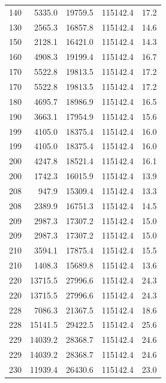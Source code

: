 \begin{longtable}{rrrrr}
    140 & \num{5335.0} & \num{19759.5} & \num{115142.4} & 17.2 \\
    130 & \num{2565.3} & \num{16857.8} & \num{115142.4} & 14.6 \\
    150 & \num{2128.1} & \num{16421.0} & \num{115142.4} & 14.3 \\
    160 & \num{4908.3} & \num{19199.4} & \num{115142.4} & 16.7 \\
    170 & \num{5522.8} & \num{19813.5} & \num{115142.4} & 17.2 \\
    170 & \num{5522.8} & \num{19813.5} & \num{115142.4} & 17.2 \\
    180 & \num{4695.7} & \num{18986.9} & \num{115142.4} & 16.5 \\
    190 & \num{3663.1} & \num{17954.9} & \num{115142.4} & 15.6 \\
    199 & \num{4105.0} & \num{18375.4} & \num{115142.4} & 16.0 \\
    199 & \num{4105.0} & \num{18375.4} & \num{115142.4} & 16.0 \\
    200 & \num{4247.8} & \num{18521.4} & \num{115142.4} & 16.1 \\
    200 & \num{1742.3} & \num{16015.9} & \num{115142.4} & 13.9 \\
    208 & \num{947.9} & \num{15309.4} & \num{115142.4} & 13.3 \\
    208 & \num{2389.9} & \num{16751.3} & \num{115142.4} & 14.5 \\
    209 & \num{2987.3} & \num{17307.2} & \num{115142.4} & 15.0 \\
    209 & \num{2987.3} & \num{17307.2} & \num{115142.4} & 15.0 \\
    210 & \num{3594.1} & \num{17875.4} & \num{115142.4} & 15.5 \\
    210 & \num{1408.3} & \num{15689.8} & \num{115142.4} & 13.6 \\
    220 & \num{13715.5} & \num{27996.6} & \num{115142.4} & 24.3 \\
    220 & \num{13715.5} & \num{27996.6} & \num{115142.4} & 24.3 \\
    228 & \num{7086.3} & \num{21367.5} & \num{115142.4} & 18.6 \\
    228 & \num{15141.5} & \num{29422.5} & \num{115142.4} & 25.6 \\
    229 & \num{14039.2} & \num{28368.7} & \num{115142.4} & 24.6 \\
    229 & \num{14039.2} & \num{28368.7} & \num{115142.4} & 24.6 \\
    230 & \num{11939.4} & \num{26430.6} & \num{115142.4} & 23.0 \\

\end{longtable}
